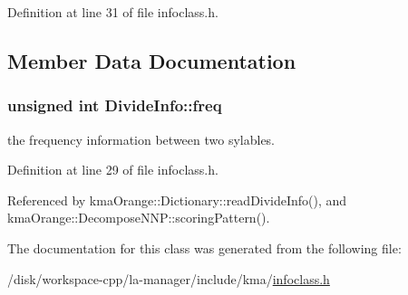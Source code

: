 Definition at line 31 of file infoclass.h.

\subsection{Member Data Documentation}
\hypertarget{classDivideInfo_bedb3100c1c1169f250df70c59afb2d8}{
\subsubsection[{freq}]{\setlength{\rightskip}{0pt plus 5cm}unsigned int {\bf DivideInfo::freq}}}
\label{classDivideInfo_bedb3100c1c1169f250df70c59afb2d8}


the frequency information between two sylables. 



Definition at line 29 of file infoclass.h.

Referenced by kmaOrange::Dictionary::readDivideInfo(), and kmaOrange::DecomposeNNP::scoringPattern().

The documentation for this class was generated from the following file:\begin{CompactItemize}
\item 
/disk/workspace-cpp/la-manager/include/kma/\hyperlink{infoclass_8h}{infoclass.h}\end{CompactItemize}
